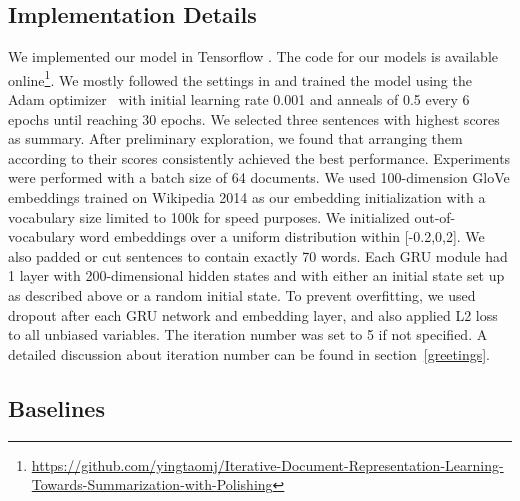 \documentclass[11pt,a4paper]{article}
\begin{document}
\subsection{Implementation Details}
\def\UrlBreaks{\do\A\do\B\do\C\do\D\do\E\do\F\do\G\do\H\do\I\do\J\do\K\do\L\do\M\do\N\do\O\do\P\do\Q\do\R\do\S\do\T\do\U\do\V\do\W\do\X\do\Y\do\Z\do\[\do\\\do\]\do\^\do\_\do\`\do\a\do\b\do\c\do\d\do\e\do\f\do\g\do\h\do\i\do\j\do\k\do\l\do\m\do\n\do\o\do\p\do\q\do\r\do\s\do\t\do\u\do\v\do\w\do\x\do\y\do\z\do\0\do\1\do\2\do\3\do\4\do\5\do\6\do\7\do\8\do\9\do\.\do\@\do\\\do\/\do\!\do\_\do\|\do\;\do\>\do\]\do\)\do\,\do\?\do\'\do+\do\=\do\#}

We implemented our model in Tensorflow \cite{abadi2016tensorflow}. The code for our models is available online\footnote{\url{https://github.com/yingtaomj/Iterative-Document-Representation-Learning-Towards-Summarization-with-Polishing}}.
We mostly followed the settings in \cite{Nallapati2016SummaRuNNer} and trained the model using the Adam optimizer~\cite{Kingma2014Adam} with initial learning rate 0.001 and anneals of 0.5 every 6 epochs until reaching 30 epochs.
We selected three sentences with highest scores as summary. After preliminary exploration, we found that arranging them according to their scores consistently achieved the best performance.
Experiments were performed with a batch size of 64 documents. 
We used 100-dimension GloVe \cite{Pennington2014Glove} embeddings trained on Wikipedia 2014 as our embedding initialization with a vocabulary size limited to 100k for speed purposes.
We initialized out-of-vocabulary word embeddings over a uniform distribution within [-0.2,0,2].
We also padded or cut sentences to contain exactly 70 words. 
Each GRU module had 1 layer with 200-dimensional hidden states and with either an initial state set up as described above or a random initial state. 
To prevent overfitting, we used dropout after each GRU network and embedding layer, and also applied L2 loss to all unbiased variables.  
The iteration number was set to 5 if not specified. A detailed discussion about iteration number can be found in section~\ref{greetings}.

\subsection{Baselines}
\end{document}

